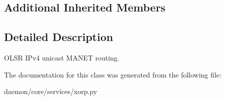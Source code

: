\subsection*{Additional Inherited Members}


\subsection{Detailed Description}
\begin{DoxyVerb}OLSR IPv4 unicast MANET routing.
\end{DoxyVerb}
 

The documentation for this class was generated from the following file\+:\begin{DoxyCompactItemize}
\item 
daemon/core/services/xorp.\+py\end{DoxyCompactItemize}
